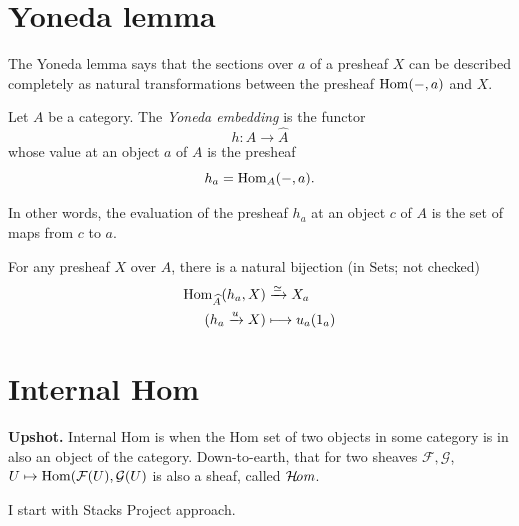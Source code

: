 \section{Yoneda lemma}
\label{section-Yoneda-lemma}

The Yoneda lemma says that the sections over
$a$
of a presheaf $X$ can be described completely
as natural transformations between the
presheaf $\mathop{\mathrm{Hom}}\nolimits(-,a)$ and $X$.

\begin{definition}
\label{definition-Yoneda-embedding}
\begin{reference}
\cite[Definition 1.1.3]{Cisinsky}
\end{reference}
Let $A$ be a category.
The {\it Yoneda embedding} is the functor
$$
h:A \to \hat{A}
$$
whose value at an object $a$ of $A$ is the
presheaf
$$
h_a=\mathop{\mathrm{Hom}}\nolimits_A(-,a).
$$
\end{definition}

In other words, the evaluation of the
presheaf
$h_a$ at an object $c$ of $A$ is the set of
maps from $c$ to $a$.

\begin{theorem}
\label{theorem-Yoneda-lemma}
\begin{reference}
\cite[Theorem 1.1.4]{Cisinsky}
\end{reference}
For any presheaf $X$ over $A$, there is a
natural bijection
(in $\text{Sets}$; not checked)
$$
\begin{aligned}
\mathop{\mathrm{Hom}}\nolimits_{\widehat{A}}(h_a,X)
&\xrightarrow{\simeq} X_a  \\
(h_a \xrightarrow{u}X) &\longmapsto u_a(1_a)
\end{aligned}
$$

\end{theorem}

\section{Internal Hom}
\label{section-internal-hom}

\noindent
{\bf Upshot.} Internal Hom is when the
Hom set of two objects in some category
is in also an object of the category.
Down-to-earth, that for two sheaves
$\mathcal{F},\mathcal{G}$,
$U\mapsto \mathop{\mathrm{Hom}}\nolimits(\mathcal{F}(U),\mathcal{G}(U)$
is also a sheaf, called $\mathop{\mathcal{H}\!\mathit{om}}\nolimits$.

\medskip\noindent
I start with Stacks Project approach.

